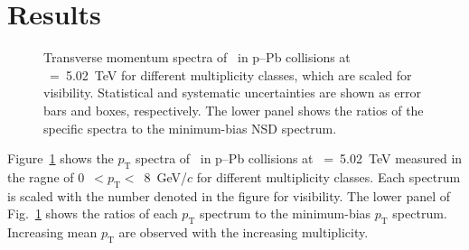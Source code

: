 
\section {Results}
\label{sec:results}

\begin{figure}[!hbt]
	\centering
	\caption{ Transverse momentum spectra of \fzero~in p--Pb collisions at \snn~=~5.02~TeV for different multiplicity classes, which are scaled for visibility. Statistical and systematic uncertainties are shown as error bars and boxes, respectively. The lower panel shows the ratios of the specific spectra to the minimum-bias NSD spectrum. }
	\label{fig:pt}
\end{figure}

Figure~\ref{fig:pt} shows the $p_{\mathrm{T}}$ spectra of \fzero~in p--Pb collisions at \snn~=~5.02~TeV measured in the ragne of 0~$<p_{\mathrm{T}}<$~8~GeV/$c$ for different multiplicity classes. Each spectrum is scaled with the number denoted in the figure for visibility. The lower panel of Fig.~\ref{fig:pt} shows the ratios of each $p_{\mathrm{T}}$ spectrum to the minimum-bias $p_{\mathrm{T}}$ spectrum. Increasing mean $p_{\mathrm{T}}$ are observed with the increasing multiplicity.


